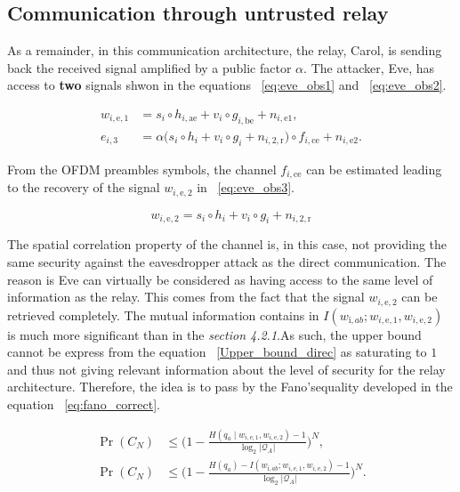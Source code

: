 \subsection{Communication through untrusted relay}

As a remainder, in this communication architecture, the relay, Carol, is sending back the received signal amplified by a public factor $\alpha$.  The attacker, Eve, has access to \textbf{two} signals shwon in the equations  ~\ref{eq:eve_obs1} and ~\ref{eq:eve_obs2}.

\begin{align}
w_{i,\mathrm{e},1} &= s_i \circ h_{i,\mathrm{ae}} + v_i \circ g_{i,\mathrm{be}} + n_{i,\mathrm{e}1}, \label{eq:eve_obs1} \\[4pt]
e_{i,3} &= \alpha \bigl( s_i \circ h_i + v_i \circ g_i + n_{i,2,\mathrm{r}} \bigr)
\circ f_{i,\mathrm{ce}} + n_{i,\mathrm{e}2}.
\label{eq:eve_obs2}
\end{align}

From the OFDM preambles symbols, the channel $f_{i,\mathrm{ce}}$ can be estimated leading to the recovery of the signal $w_{i,\mathrm{e},2}$ in ~\ref{eq:eve_obs3}.

\begin{equation}
    w_{i,\mathrm{e},2} = s_i \circ h_i + v_i \circ g_i + n_{i,2,\mathrm{r}}
    \label{eq:eve_obs3}
\end{equation}

The spatial correlation property of the channel is, in this case, not providing the same security against the eavesdropper attack as the direct communication.  The reason is Eve can virtually be considered as having access to the same level of information as the relay.  This comes from the fact that the signal $w_{i,\mathrm{e},2}$ can be retrieved completely.
The mutual information contains in $I(w_{\mathrm{i},ab};w_{i,\mathrm{e},1},w_{i,\mathrm{e},2})$ is much more significant than in the \textit{section 4.2.1}.As such, the upper bound cannot be express from the equation ~\ref{Upper_bound_direc} as saturating to $1$ and thus not giving relevant information about the level of security for the relay architecture.  Therefore, the idea is to pass by the Fano'sequality developed in the equation ~\ref{eq:fano_correct}.

\begin{align}
    \Pr(C_N)
    &\le
    \bigl(
    1 -
    \frac{H(q_a \mid w_{i,\mathrm{e},1},w_{i,\mathrm{e},2}) - 1}{\log_2 \lvert \mathcal{Q}_A \rvert}\bigr)^N, \\[6pt]
    \label{eq:fano_correct}
    \Pr(C_N)
    &\le
    \bigl(
    1 -
    \frac{H(q_a) - I(w_{\mathrm{i},ab};w_{i,\mathrm{e},1},w_{i,\mathrm{e},2}) -1 }{\log_2 \lvert \mathcal{Q}_A \rvert}\bigr)^N.
\end{align}

